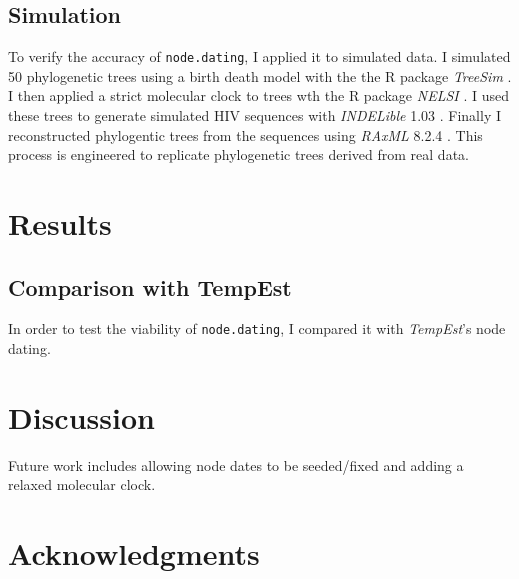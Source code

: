 \documentclass[12pt]{article}
\newcommand{\code}[1]{{\tt #1}}
\begin{document}
\subsection*{Simulation} \label{sec:sim}
To verify the accuracy of \code{node.dating}, I applied it to simulated data. I simulated 50 phylogenetic trees using a birth death model with the the R package \emph{TreeSim} \citep{TreeSim}. I then applied a strict molecular clock to trees wth the R package \emph{NELSI} \citep{NELSI}. I used these trees to generate simulated HIV sequences with \emph{INDELible} 1.03 \citep{Indelible09}. Finally I reconstructed phylogentic trees from the sequences using \emph{RAxML} 8.2.4 \citep{Raxml14}. This process is engineered to replicate phylogenetic trees derived from real data.

\section*{Results} \label{sec:results}
\subsection*{Comparison with TempEst} \label{sec:tempest}
In order to test the viability of \code{node.dating}, I compared it with \emph{TempEst}'s \citep{Tempest} node dating.



\section*{Discussion} \label{sec:discuss}

Future work includes allowing node dates to be seeded/fixed and adding a relaxed molecular clock.

\section*{Acknowledgments} \label{sec:ackn}

\clearpage





\clearpage


\end{document}
